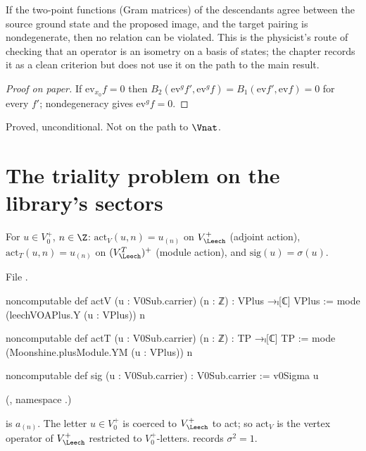\begin{physics}
If the two-point functions (Gram matrices) of the descendants agree between the source ground state and the proposed image, and the target pairing is nondegenerate, then no relation can be violated. This is the physicist's route of checking that an operator is an isometry on a basis of states; the chapter records it as a clean criterion but does not use it on the path to the main result.
\end{physics}
\begin{proof}[Proof on paper]
If $\mathrm{ev}_{x_0}f=0$ then $B_2(\mathrm{ev}^gf',\mathrm{ev}^gf)=B_1(\mathrm{ev}f',\mathrm{ev}f)=0$ for every
$f'$; nondegeneracy gives $\mathrm{ev}^gf=0$.
\end{proof}
\begin{status}Proved, unconditional.  Not on the path to $\Vnat$.\end{status}

\section{The triality problem on the library's sectors}\label{ch12:sec:sectors}

\begin{definition}\label{ch12:def:actions}
For $u\in V_0^+$, $n\in\Z$: $\mathrm{act}_V(u,n)=u_{(n)}$ on $V_\Leech^+$ (adjoint action),
$\mathrm{act}_T(u,n)=u_{(n)}$ on $(V_\Leech^T)^+$ (module action), and $\mathrm{sig}(u)=\sigma(u)$.
\end{definition}
File .
\begin{leancode}
noncomputable def actV (u : V0Sub.carrier) (n : ℤ) : VPlus →ₗ[ℂ] VPlus :=
  mode (leechVOAPlus.Y (u : VPlus)) n

noncomputable def actT (u : V0Sub.carrier) (n : ℤ) : TP →ₗ[ℂ] TP :=
  mode (Moonshine.plusModule.YM (u : VPlus)) n

noncomputable def sig (u : V0Sub.carrier) : V0Sub.carrier := v0Sigma u
\end{leancode}
(, namespace .)
\begin{dictionary}
 is $a_{(n)}$.  The letter $u\in V_0^+$ is coerced to $V_\Leech^+$ to act; so
$\mathrm{act}_V$ is the vertex operator of $V_\Leech^+$ restricted to $V_0^+$-letters.
 records $\sigma^2=1$.
\end{dictionary}


